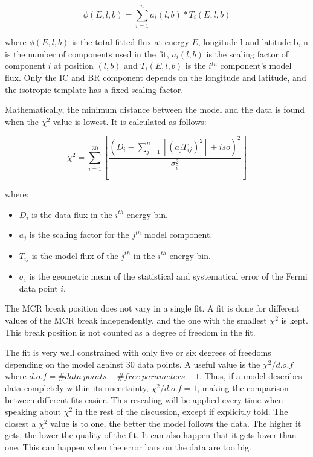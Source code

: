 \begin{equation}
\phi(E,l,b) = \sum_{i=1}^{n} a_i(l,b)*T_i(E,l,b)
\end{equation}

where $\phi(E,l,b)$ is the total fitted flux at energy $E$, longitude l and latitude b, n is the number of components used in the fit, $a_i(l,b)$ is the scaling factor of component $i$ at position $(l,b)$ and $T_i(E,l,b)$ is the $i^{th}$ component's model flux. Only the IC and BR component depends on the longitude and latitude, and the isotropic template has a fixed scaling factor.

Mathematically, the minimum distance between the model and the data is found when the $\chi^2$ value is lowest. It is calculated as follows:

\begin{equation}
\chi^2 = \sum_{i=1}^{30} \left[ \frac{ \left( D_i - \sum_{j=1}^{n} \left[ (a_jT_{ij})^2 \right] + iso \right) ^2}{\sigma_i^2} \right]
\end{equation}

where:
\begin{itemize}
\item $D_i$ is the data flux in the $i^{th}$ energy bin.
\item $a_j$ is the scaling factor for the $j^{th}$ model component.
\item $T_{ij}$ is the model flux of the $j^{th}$ in the $i^{th}$ energy bin.
\item $\sigma_i$ is the geometric mean of the statistical and systematical error of the Fermi data point $i$.
\end{itemize}

The MCR break position does not vary in a single fit. A fit is done for different values of the MCR break independently, and the one with the smallest $\chi^2$ is kept. This break position is not counted as a degree of freedom in the fit.

The fit is very well constrained with only five or six degrees of freedoms depending on the model against 30 data points. A useful value is the $\chi^2 / d.o.f$ where $d.o.f = \#data\ points - \#free\ parameters - 1$. Thus, if a model describes data completely within its uncertainty, $\chi^2 / d.o.f = 1$, making the comparison between different fits easier. This rescaling will be applied every time when speaking about $\chi^2$ in the rest of the discussion, except if explicitly told. 
The closest a $\chi^2$ value is to one, the better the model follows the data. The higher it gets, the lower the quality of the fit. It can also happen that it gets lower than one. This can happen when the error bars on the data are too big.


